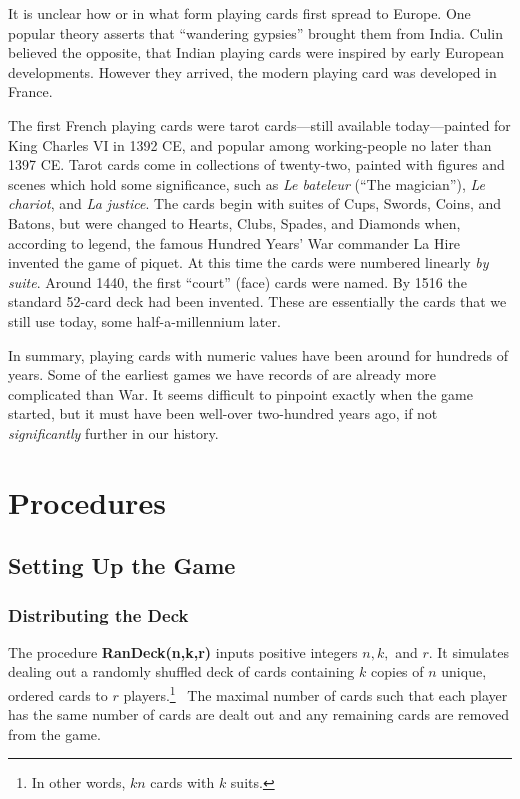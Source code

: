 \documentclass[12pt]{amsart}
\begin{document}
It is unclear how or in what form playing cards first spread to Europe. One
popular theory asserts that ``wandering gypsies'' brought them from India.
Culin believed the opposite, that Indian playing cards were inspired by early
European developments. However they arrived, the modern playing card was
developed in France.


The first French playing cards were tarot cards---still available
today---painted for King Charles VI in 1392 CE, and popular among
working-people no later than 1397 CE. Tarot cards come in collections of
twenty-two, painted with figures and scenes which hold some significance, such
as \emph{Le bateleur} (``The magician''), \emph{Le chariot}, and \emph{La
justice}. The cards begin with suites of Cups, Swords, Coins, and Batons, but
were changed to Hearts, Clubs, Spades, and Diamonds when, according to legend,
the famous Hundred Years' War commander La Hire invented the game of piquet. At
this time the cards were numbered linearly \emph{by suite}. Around 1440, the
first ``court'' (face) cards were named. By 1516 the standard 52-card deck had
been invented. These are essentially the cards that we still use today, some
half-a-millennium later.

In summary, playing cards with numeric values have been around for hundreds of
years. Some of the earliest games we have records of are already more
complicated than War. It seems difficult to pinpoint exactly when the game
started, but it must have been well-over two-hundred years ago, if not
\emph{significantly} further in our history.


\section{Procedures}
\label{sec:procedures}
\subsection{Setting Up the Game}


\subsubsection{Distributing the Deck} \hfill


The procedure \textbf{RanDeck(n,k,r)} inputs positive integers $n,k,$ and $r$. It simulates dealing out a randomly shuffled deck of cards containing $k$ copies of $n$ unique, ordered cards to $r$ players.\footnote{In other words, $kn$ cards with $k$ suits.}
 The maximal number of cards such that each player has the same number of cards are dealt out and any remaining cards are removed from the game.
\end{document}
